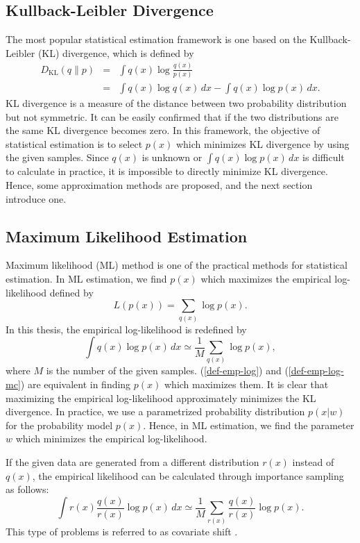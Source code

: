 \subsection{Kullback-Leibler Divergence}
The most popular statistical estimation framework
is one based on the Kullback-Leibler (KL) 
divergence, which is defined by
\begin{eqnarray}
 D_{\mathrm{KL}}(q \parallel p) 
&=& \int q(x) \log \frac{q(x)}{p(x)} \\
&=& \int q(x) \log q(x) \, dx - \int q(x) \log p(x) \, dx.
\end{eqnarray}
KL divergence is a measure of the distance between 
two probability distribution but not symmetric.
It can be easily confirmed that if the two distributions are the same
KL divergence becomes zero.
In this framework, 
the objective of statistical estimation is
to select $p(x)$ which minimizes KL divergence by using the given samples.
Since $q(x)$ is unknown or $\int q(x) \log p(x) \, dx$ is difficult to
calculate in practice, 
it is impossible to directly minimize KL divergence.
Hence, some approximation methods are proposed,
and the next section introduce one.

\subsection{Maximum Likelihood Estimation}
Maximum likelihood (ML) method \nocite{hastie:slearning} is 
one of the practical methods for statistical estimation.
In ML estimation, we find $p(x)$ which maximizes the empirical log-likelihood
defined by
\begin{equation}
 L(p(x))=\sum_{q(x)} \log p(x).
\label{def-emp-log}
\end{equation}
In this thesis, the empirical log-likelihood is redefined by
\begin{equation}
  \int q(x) \log p(x) \, dx \simeq \frac{1}{M} \sum_{q(x)} \log p(x),
\label{def-emp-log-mc}
\end{equation}
where $M$ is the number of the given samples.
(\ref{def-emp-log}) and (\ref{def-emp-log-mc}) are equivalent in finding $p(x)$ which maximizes them.
It is clear that maximizing the empirical log-likelihood 
approximately minimizes the KL divergence.
In practice, we use a parametrized probability distribution $p(x|w)$ for
the probability model $p(x)$. Hence,
in ML estimation, we find the parameter $w$ which minimizes the empirical log-likelihood. 

If the given data are generated from a different distribution $r(x)$ instead
of $q(x)$,
the empirical likelihood can be calculated through importance sampling
as follows:
\begin{equation}
  \int r(x) \frac{q(x)}{r(x)} \log p(x) \, dx \simeq 
\frac{1}{M} \sum_{r(x)} \frac{q(x)}{r(x)} \log p(x).
\end{equation}
This type of problems is referred to as covariate shift \cite{shimodaira:wis-aic}.


